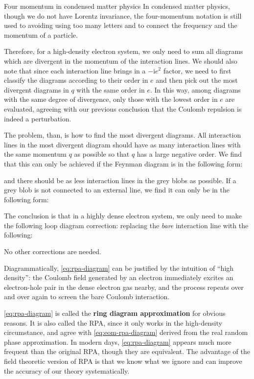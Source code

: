 \documentclass[hyperref, a4paper]{article}
\newcommand*{\ii}{\mathrm{i}}
\newcommand*{\concept}[1]{{\textbf{#1}}}
\begin{document}
\begin{note*}{Four momentum in condensed matter physics}
    In condensed matter physics, though we do not have Lorentz invariance, the four-momentum notation is 
    still used to avoiding using too many letters and to connect the frequency and the momentum of a particle.
\end{note*}

Therefore, for a high-density electron system, we only need to sum all diagrams which are divergent in the 
momentum of the interaction lines. We should also note that since each interaction line brings in a $- \ii e^2$
factor, we need to first classify the diagrams according to their order in $e$ and then pick out the most 
divergent diagrams in $q$ with the same order in $e$. In this way, among diagrams with the same degree of
divergence, only those with the lowest order in $e$ are evaluated, agreeing with our previous conclusion that 
the Coulomb repulsion is indeed a perturbation. 

The problem, than, is how to find the most divergent diagrams. All interaction lines in the most divergent diagram 
should have as many interaction lines with the same momentum $q$ as possible so that $q$ has a large negative
order. We find that this can only be achieved if the Feynman diagram is in the following form:

and there should be as less interaction lines in the grey blobs as possible. If a grey blob is not connected 
to an external line, we find it can only be in the following form: 

The conclusion is that in a highly dense electron system, we only need to make the following loop diagram
correction: replacing the \emph{bare} interaction line with the following:

No other corrections are needed. 

Diagrammatically, \eqref{eq:rpa-diagram} can be justified by the intuition of ``high density'': the Coulomb field 
generated by an electron immediately excites an electron-hole pair in the dense electron gas nearby, and the 
process repeats over and over again to screen the bare Coulomb interaction.

\eqref{eq:rpa-diagram} is called the \concept{ring diagram approximation} for obvious reasons. It is also 
called the RPA, since it only works in the high-density circumstance, and agree with \eqref{eq:eom-rpa-diagram}
derived from the real random phase approximation. In modern days, \eqref{eq:rpa-diagram} appears much more 
frequent than the original RPA, though they are equivalent. The advantage of the field theoretic version of RPA 
is that we know what we ignore and can improve the accuracy of our theory systematically.
\end{document}

